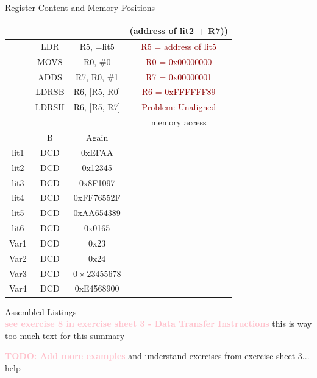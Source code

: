 \begin{example2}{Register Content and Memory Positions}
\begin{center}
\begin{tabular}{|c|c|c|c|}
 & & & (address of lit2 + R7)) \\
\hline
 & LDR & R5, =lit5 & \textcolor{darkred}{R5 = address of lit5} \\
\hline
 & MOVS & R0, \#0 & \textcolor{darkred}{R0 = 0x00000000} \\
\hline
 & ADDS & R7, R0, \#1 & \textcolor{darkred}{R7 = 0x00000001} \\
\hline
 & LDRSB & R6, [R5, R0] & \textcolor{darkred}{R6 = 0xFFFFFF89} \\
\hline
 & LDRSH & R6, [R5, R7] & \textcolor{darkred}{Problem: Unaligned}  \\
 & & & memory access \\
\hline
 & B & Again &  \\
\hline
lit1 & DCD & 0xEFAA &  \\
\hline
lit2 & DCD & 0x12345 &  \\
\hline
lit3 & DCD & 0x8F1097 &  \\
\hline
lit4 & DCD & 0xFF76552F &  \\
\hline
lit5 & DCD & 0xAA654389 &  \\
\hline
lit6 & DCD & 0x0165 &  \\
\hline
Var1 & DCD & 0x23 &  \\
\hline
Var2 & DCD & 0x24 &  \\
\hline
Var3 & DCD & $0 \times 23455678$ &  \\
\hline
Var4 & DCD & 0xE4568900 &  \\
\hline
\end{tabular}
\end{center}
\end{example2}

\begin{example2}{Assembled Listings}\\
\textcolor{pink}{\textbf{see exercise 8 in exercise sheet 3 - Data Transfer Instructions}}
this is way too much text for this summary
\end{example2}

\textcolor{pink}{\textbf{TODO: Add more examples}} and understand exercises from exercise sheet 3... help

